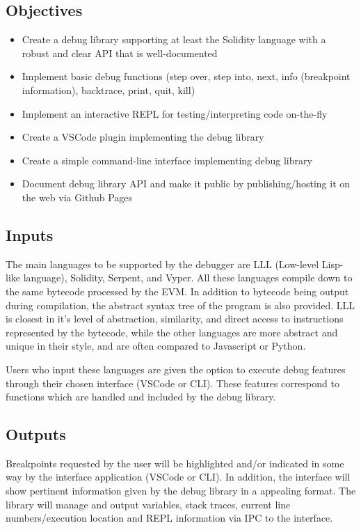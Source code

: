 \documentclass[]{article}
\begin{document}
\subsection{Objectives}
\begin{itemize}
	\item Create a debug library supporting at least the Solidity language with a robust and clear API that is well-documented
	\item Implement basic debug functions (step over, step into, next, info (breakpoint information), backtrace, print, quit, kill)
	\item Implement an interactive REPL for testing/interpreting code on-the-fly
	\item Create a VSCode plugin implementing the debug library
	\item Create a simple command-line interface implementing debug library
	\item Document debug library API and make it public by publishing/hosting it on the web via Github Pages
\end{itemize}

\subsection{Inputs}
The main languages to be supported by the debugger are LLL (Low-level Lisp-like language), Solidity, Serpent, and Vyper. All these languages compile down to the same bytecode processed by the EVM. In addition to bytecode being output during compilation, the abstract syntax tree of the program is also provided. LLL is closest in it's level of abstraction, similarity, and direct access to instructions represented by the bytecode, while the other languages are more abstract and unique in their style, and are often compared to Javascript or Python.

Users who input these languages are given the option to execute debug features through their chosen interface (VSCode or CLI). These features correspond to functions which are handled and included by the debug library.

\subsection{Outputs}
Breakpoints requested by the user will be highlighted and/or indicated in some way by the interface application (VSCode or CLI). In addition, the interface will show pertinent information given by the debug library in a appealing format. The library will manage and output variables, stack traces, current line numbers/execution location and REPL information via IPC to the interface.
\end{document}

